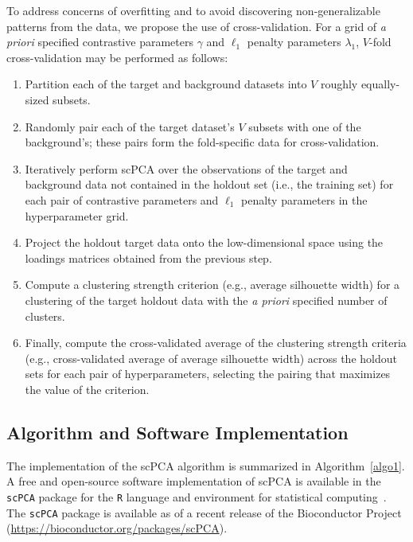 To address concerns of overfitting and to avoid discovering non-generalizable patterns from the data, we propose the use of cross-validation. For a grid of \textit{a priori} specified contrastive parameters $\gamma$ and $\ell_1$ penalty parameters $\lambda_1$, $V$-fold cross-validation may be performed as follows:
\begin{enumerate}
  \itemsep0pt
  \item Partition each of the target and     
     background datasets into $V$ roughly
     equally-sized subsets.
   \item Randomly pair each of the target dataset's $V$ subsets with one of the
     background's; these pairs form the fold-specific data for cross-validation.
   \item Iteratively perform scPCA over the 
     observations of the target and
     background data not contained in the holdout set (i.e., the training set)
     for each pair of contrastive parameters and $\ell_1$ penalty parameters in
     the hyperparameter grid.
  \item Project the holdout target data onto the    low-dimensional space using
     the loadings matrices obtained from the previous step.
  \item Compute a clustering strength criterion (e.g., average
  silhouette width) for a clustering of the target holdout data with the \textit{a priori}
  specified number of clusters.
  \item Finally, compute the cross-validated average of the clustering
  strength criteria (e.g., cross-validated average of average silhouette width)
  across the holdout sets for each pair of hyperparameters, selecting the
  pairing that maximizes the value of the criterion.
\end{enumerate}

\subsection{Algorithm and Software Implementation}

The implementation of the scPCA algorithm is summarized in
Algorithm~\ref{algo1}. A free and open-source software implementation of scPCA is
available in the \texttt{scPCA} package for the \texttt{R} language and
environment for statistical computing~\cite{R}. The \texttt{scPCA} package is available as of a recent release of the Bioconductor Project
\cite{gentleman2004bioconductor,gentleman2006bioinformatics,huber2015orchestrating} (\url{https://bioconductor.org/packages/scPCA}).


